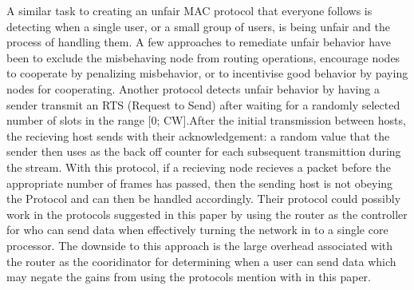 \documentclass{sigcomm-alternate}
\begin{document}
A similar task to creating an unfair MAC protocol that everyone follows is detecting when a single user, or a small group of users, is being unfair and the process of handling them. A few approaches to remediate unfair behavior have been to exclude the misbehaving node from routing operations, encourage nodes to cooperate by penalizing misbehavior, or to incentivise good behavior by paying nodes for cooperating. Another protocol detects unfair behavior by having a sender transmit an RTS (Request to Send) after waiting for a randomly selected number of slots in the range [0; CW].After the initial transmission between hosts, the recieving host sends with their acknowledgement: a random value that the sender then uses as the back off counter for each subsequent transmittion during the stream. \cite{Kyasanur} With this protocol, if a recieving node recieves a packet before the appropriate number of frames has passed, then the sending host is not obeying the Protocol and can then be handled accordingly. Their protocol could possibly work in the protocols suggested in this paper by using the router as the controller for who can send data when effectively turning the network in to a single core processor. The downside to this approach is the large overhead associated with the router as the cooridinator for determining when a user can send data which may negate the gains from using the protocols mention with in this paper.
\end{document}
